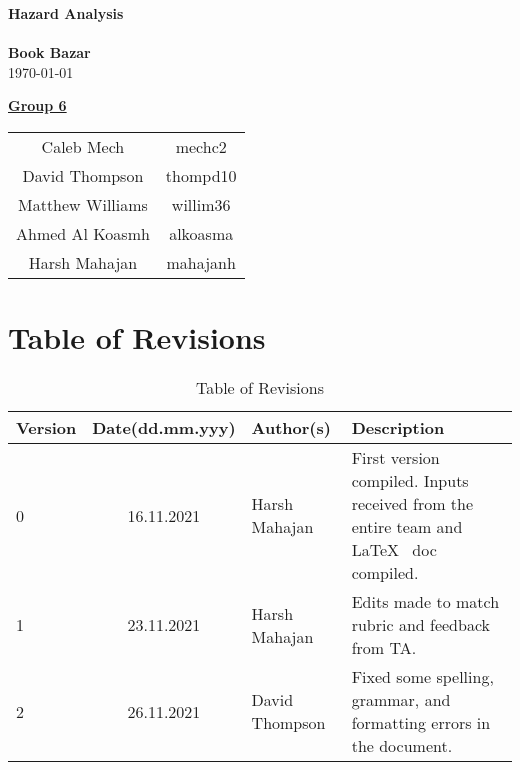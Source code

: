 \documentclass[fullpage]{article}
\begin{document}
\vspace*{\fill}
\begin{center}

  {\Huge \textbf{Hazard Analysis}}\\
\hrulefill\\[2mm]
  {\huge \textbf{Book Bazar}}\\[2mm]
{\large \today}\\[15mm]
{\large
\underline{\textbf{Group 6}}\\
\begin{tabular}{ c c }

 Caleb Mech & mechc2\\
 David Thompson & thompd10\\
 Matthew Williams & willim36\\
 Ahmed Al Koasmh & alkoasma\\
 Harsh Mahajan	& mahajanh
\end{tabular}
}

\end{center}

\vspace*{\fill}

\newpage
\begingroup
\hypersetup{hidelinks}
\tableofcontents

\listoftables
\endgroup
\newpage


\section*{Table of Revisions}
\begin{table}[h]
\centering
\begin{tabular}{| l | c | p{2.8cm}| p{3.5cm} |}
\hline
 \rowcolor{lightgray}
\textbf{Version} & \textbf{Date(dd.mm.yyy)} &\textbf{Author(s)} &\textbf{Description}\\
\hline
0 & 16.11.2021 &  Harsh Mahajan & First version compiled. Inputs received from the entire team and \LaTeX~ doc compiled.\\
\hline
1 & 23.11.2021 &  Harsh Mahajan & Edits made to match rubric and feedback from TA.\\
\hline
2 & 26.11.2021 & David Thompson & Fixed some spelling, grammar, and formatting errors in the document. \\
\hline
\end{tabular}
\caption{Table of Revisions}

\end{table}
\end{document}
